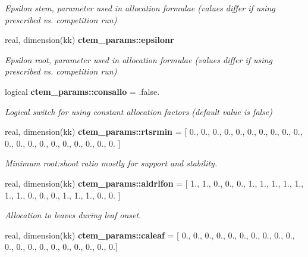 \begin{DoxyCompactItemize}
\begin{DoxyCompactList}\small\item\em Epsilon stem, parameter used in allocation formulae (values differ if using prescribed vs. competition run) \end{DoxyCompactList}\item 
\hypertarget{namespacectem__params_aa0fc6a57a8dd09d0a6d57ccf9c2fdf5b}{}real, dimension(kk) {\bfseries ctem\+\_\+params\+::epsilonr}\label{namespacectem__params_aa0fc6a57a8dd09d0a6d57ccf9c2fdf5b}

\begin{DoxyCompactList}\small\item\em Epsilon root, parameter used in allocation formulae (values differ if using prescribed vs. competition run) \end{DoxyCompactList}\item 
\hypertarget{namespacectem__params_a7fc44574a63fd52e0b2556ba693de814}{}logical {\bfseries ctem\+\_\+params\+::consallo} = .false.\label{namespacectem__params_a7fc44574a63fd52e0b2556ba693de814}

\begin{DoxyCompactList}\small\item\em Logical switch for using constant allocation factors (default value is false) \end{DoxyCompactList}\item 
\hypertarget{namespacectem__params_ac542a7713cfae8ce6e7197c8d60c2081}{}real, dimension(kk) {\bfseries ctem\+\_\+params\+::rtsrmin} = \mbox{[} 0., 0., 0., 0., 0., 0., 0., 0., 0., 0., 0., 0., 0., 0., 0., 0., 0., 0., 0., 0. \mbox{]}\label{namespacectem__params_ac542a7713cfae8ce6e7197c8d60c2081}

\begin{DoxyCompactList}\small\item\em Minimum root\+:shoot ratio mostly for support and stability. \end{DoxyCompactList}\item 
\hypertarget{namespacectem__params_ab8a436206695f5f6c93d0579187ba037}{}real, dimension(kk) {\bfseries ctem\+\_\+params\+::aldrlfon} = \mbox{[} 1., 1., 0., 0., 0., 1., 1., 1., 1., 1., 1., 1., 0., 0., 0., 1., 1., 1., 0., 0. \mbox{]}\label{namespacectem__params_ab8a436206695f5f6c93d0579187ba037}

\begin{DoxyCompactList}\small\item\em Allocation to leaves during leaf onset. \end{DoxyCompactList}\item 
\hypertarget{namespacectem__params_a593225b4810a8b566176f0ada4a2ad7a}{}real, dimension(kk) {\bfseries ctem\+\_\+params\+::caleaf} = \mbox{[} 0., 0., 0., 0., 0., 0., 0., 0., 0., 0., 0., 0., 0., 0., 0., 0., 0., 0., 0., 0.\mbox{]}\label{namespacectem__params_a593225b4810a8b566176f0ada4a2ad7a}


\end{DoxyCompactItemize}
